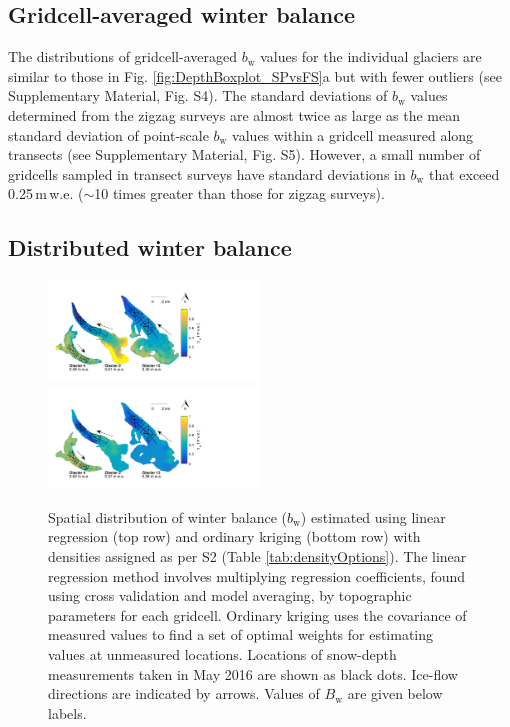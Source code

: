 \documentclass[twocolumn, letterpaper]{igs}
\begin{document}
\subsection{Gridcell-averaged winter balance}

The distributions of gridcell-averaged $b_\mathrm{w}$ values for the individual glaciers are similar to those in Fig. \ref{fig:DepthBoxplot_SPvsFS}a but with fewer outliers (see Supplementary Material, Fig. S4). The standard deviations of $b_\mathrm{w}$ values determined from the zigzag surveys are almost twice as large as the mean standard deviation of point-scale $b_\mathrm{w}$ values within a gridcell measured along transects (see Supplementary Material, Fig. S5). However, a small number of gridcells sampled in transect surveys have standard deviations in $b_\mathrm{w}$ that exceed 0.25\,m\,w.e. ($\sim$10 times greater than those for zigzag surveys). 

\subsection{Distributed winter balance}

\begin{figure}
	\centering
	\includegraphics[width =0.5\textwidth]{LR_map.pdf}\\
    \includegraphics[width =0.5\textwidth]{OK_map.pdf}\\
	\caption{Spatial distribution of winter balance ($b_\mathrm{w}$) estimated using linear regression (top row) and ordinary kriging (bottom row) with densities assigned as per S2 (Table \ref{tab:densityOptions}). The linear regression method involves multiplying regression coefficients, found using cross validation and model averaging, by topographic parameters for each gridcell. Ordinary kriging uses the covariance of measured values to find a set of optimal weights for estimating values at unmeasured locations. Locations of snow-depth measurements taken in May 2016 are shown as black dots. Ice-flow directions are indicated by arrows. Values of $B_\mathrm{w}$ are given below labels.}
	\label{fig:LR_OK_map}
\end{figure}
\end{document}
